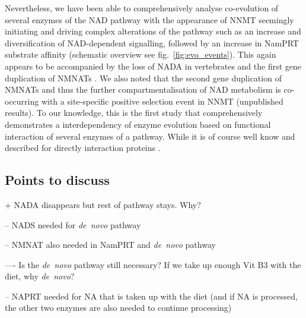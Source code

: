 Nevertheless, we have been able to comprehensively analyse co-evolution of several enzymes of the NAD pathway with the appearance of NNMT seemingly initiating and driving complex alterations of the pathway such as an increase and diversification of NAD-dependent signalling, followed by an increase in NamPRT substrate affinity (schematic overview see fig.~\ref{fig:evo_events}). This again appears to be accompanied by the loss of NADA in vertebrates and the first gene duplication of NMNATs \cite{Lau2010}. We also noted that the second gene duplication of NMNATs and thus the further compartmentalisation of NAD metabolism is co-occurring with a site-specific positive selection event in NNMT (unpublished results). To our knowledge, this is the first study that comprehensively demonstrates a interdependency of enzyme evolution based on functional interaction of several enzymes of a pathway. While it is of course well know and described for directly interaction proteins .




\subsection{Points to discuss}



+ NADA disappears but rest of pathway stays. Why?

-- NADS needed for \textit{de~novo} pathway

-- NMNAT also needed in NamPRT and \textit{de~novo} pathway

---- Is the \textit{de~novo} pathway still necessary? If we take up enough Vit B3 with the diet, why \textit{de~novo}?

-- NAPRT needed for NA that is taken up with the diet (and if NA is processed, the other two enzymes are also needed to continue processing)


